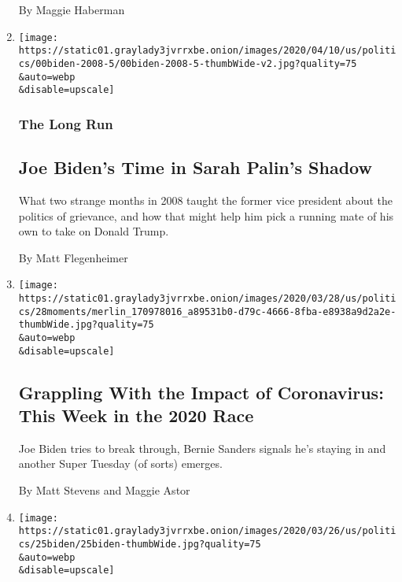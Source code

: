 \begin{enumerate}
  By Maggie Haberman
\item
  \href{/2020/05/11/us/politics/joe-biden-sarah-palin-2008.html}{}

  \texttt{[image: https://static01.graylady3jvrrxbe.onion/images/2020/04/10/us/politics/00biden-2008-5/00biden-2008-5-thumbWide-v2.jpg?quality=75\\\&auto=webp\\\&disable=upscale]}

  \hypertarget{the-long-run}{%
  \subsubsection{The Long Run}\label{the-long-run}}

  \hypertarget{joe-bidens-time-in-sarah-palins-shadow}{%
  \subsection{Joe Biden's Time in Sarah Palin's
  Shadow}\label{joe-bidens-time-in-sarah-palins-shadow}}

  What two strange months in 2008 taught the former vice president about
  the politics of grievance, and how that might help him pick a running
  mate of his own to take on Donald Trump.

  By Matt Flegenheimer
\item
  \href{/2020/03/28/us/politics/coronavirus-biden-trump-sanders.html}{}

  \texttt{[image: https://static01.graylady3jvrrxbe.onion/images/2020/03/28/us/politics/28moments/merlin\_170978016\_a89531b0-d79c-4666-8fba-e8938a9d2a2e-thumbWide.jpg?quality=75\\\&auto=webp\\\&disable=upscale]}

  \hypertarget{grappling-with-the-impact-of-coronavirus-this-week-in-the-2020-race}{%
  \subsection{Grappling With the Impact of Coronavirus: This Week in the
  2020
  Race}\label{grappling-with-the-impact-of-coronavirus-this-week-in-the-2020-race}}

  Joe Biden tries to break through, Bernie Sanders signals he's staying
  in and another Super Tuesday (of sorts) emerges.

  By Matt Stevens and Maggie Astor
\item
  \href{/2020/03/25/us/politics/bernie-sanders-joe-biden-next-debate.html}{}

  \texttt{[image: https://static01.graylady3jvrrxbe.onion/images/2020/03/26/us/politics/25biden/25biden-thumbWide.jpg?quality=75\\\&auto=webp\\\&disable=upscale]}


\end{enumerate}
